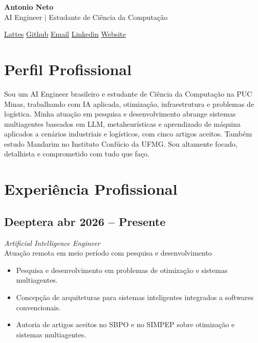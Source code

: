 \documentclass[a4paper,10pt]{article}
\begin{document}
\begin{center}
    \textbf{\Huge Antonio Neto} \\
    \vspace{2mm}
     AI Engineer $|$ Estudante de Ciência da Computação
\end{center}

\vspace{4mm}
\begin{center}
     \href{https://lattes.cnpq.br/6284651096866272}{Lattes} \hspace{1.5cm}
     \href{https://github.com/nietus}{Github} \hspace{1.5cm}
     \href{mailto:antonio@deeptera.com}{Email} \hspace{1.5cm}
     \href{https://www.linkedin.com/in/antonioniet/}{Linkedin} \hspace{1.5cm}
     \href{https://antonio.niet.com.br}{Website}
\end{center}

\space
\section*{ Perfil Profissional}
Sou um AI Engineer brasileiro e estudante de Ciência da Computação na PUC Minas, trabalhando com IA aplicada, otimização, infraestrutura e problemas de logística. Minha atuação em pesquisa e desenvolvimento abrange sistemas multiagentes baseados em LLM, metaheurísticas e aprendizado de máquina aplicados a cenários industriais e logísticos, com cinco artigos aceitos. Também estudo Mandarim no Instituto Confúcio da UFMG. Sou altamente focado, detalhista e comprometido com tudo que faço.

\section*{ Experiência Profissional}

\subsection*{Deeptera \hfill abr 2026 -- Presente}
\textit{Artificial Intelligence Engineer} \\
Atuação remota em meio período com pesquisa e desenvolvimento
\begin{itemize}
    \item Pesquisa e desenvolvimento em problemas de otimização e sistemas multiagentes.
    \item Concepção de arquiteturas para sistemas inteligentes integrados a softwares convencionais.
    \item Autoria de artigos aceitos no SBPO e no SIMPEP sobre otimização e sistemas multiagentes.
\end{itemize}
\end{document}
